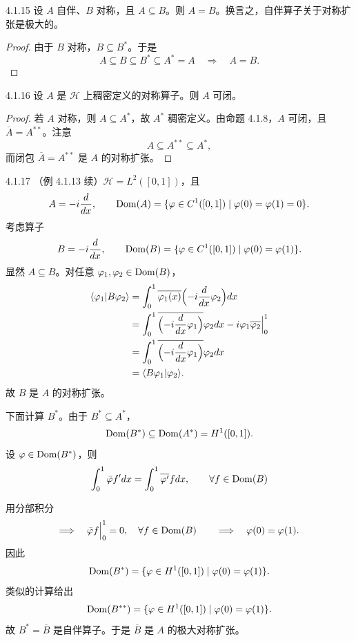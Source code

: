 \begin{corollary}{4.1.15}
  设 $A$ 自伴、$B$ 对称，且 $A\subseteq B$。则 $A=B$。换言之，自伴算子关于对称扩张是极大的。
\end{corollary}

\begin{proof}
  由于 $B$ 对称，$B\subseteq B^*$。于是
  \[
  A\subseteq B\subseteq B^*\subseteq A^*=A
  \quad\Longrightarrow\quad
  A=B.
  \]
\end{proof}

\begin{proposition}{4.1.16}
  设 $A$ 是 $\mathcal{H}$ 上稠密定义的对称算子。则 $A$ 可闭。
\end{proposition}

\begin{proof}
  若 $A$ 对称，则 $A\subseteq A^*$，故 $A^*$ 稠密定义。由命题 4.1.8，$A$ 可闭，且 $\overline{A}=A^{**}$。注意
  \[
  A\subseteq A^{**}\subseteq A^*,
  \]
  而闭包 $\overline{A}=A^{**}$ 是 $A$ 的对称扩张。
\end{proof}

\begin{example}{4.1.17}
  （例 4.1.13 续）$\mathcal{H}=L^2([0,1])$，且
  \[
  A=-i\frac{d}{d x},\qquad
  \operatorname{Dom}(A)=\{\varphi\in C^1([0,1])\mid\varphi(0)=\varphi(1)=0\}.
  \]
  考虑算子
  \[
  B=-i\frac{d}{d x},\qquad
  \operatorname{Dom}(B)=\{\varphi\in C^1([0,1])\mid\varphi(0)=\varphi(1)\}.
  \]
  显然 $A\subseteq B$。对任意 $\varphi_1,\varphi_2\in\operatorname{Dom}(B)$，
  \[
  \begin{aligned}
  \langle \varphi_1|B\varphi_2\rangle
  &=\int_0^1\overline{\varphi_1(x)}\Bigl(-i\frac{d}{d x}\varphi_2\Bigr)d x\\
  &=\int_0^1\overline{\Bigl(-i\frac{d}{d x}\varphi_1\Bigr)}\varphi_2d x
  -i\varphi_1\overline{\varphi_2}\Big|_0^1\\
  &=\int_0^1\overline{\Bigl(-i\frac{d}{d x}\varphi_1\Bigr)}\varphi_2d x\\
  &=\langle B\varphi_1|\varphi_2\rangle.
  \end{aligned}
  \]
  故 $B$ 是 $A$ 的对称扩张。

  下面计算 $B^*$。由于 $B^*\subseteq A^*$，
  \[
  \operatorname{Dom}(B^*)\subseteq\operatorname{Dom}(A^*)=H^1([0,1]).
  \]
  设 $\varphi\in\operatorname{Dom}(B^*)$，则
  \[
  \int_0^1\bar\varphi f'd x=\int_0^1\overline{\varphi'}fd x,\qquad\forall f\in\operatorname{Dom}(B)
  \]

  用分部积分
  \[
  \Longrightarrow\quad \bar\varphi f\Big|_0^1=0,\quad\forall f\in\operatorname{Dom}(B)
  \qquad\Longrightarrow\quad \varphi(0)=\varphi(1).
  \]
  因此
  \[
  \operatorname{Dom}(B^*)=\{\varphi\in H^1([0,1])\mid\varphi(0)=\varphi(1)\}.
  \]
  类似的计算给出
  \[
  \operatorname{Dom}(B^{**})=\{\varphi\in H^1([0,1])\mid\varphi(0)=\varphi(1)\}.
  \]
  故 $B^*=\overline{B}$ 是自伴算子。于是 $\overline{B}$ 是 $A$ 的极大对称扩张。
\end{example}

